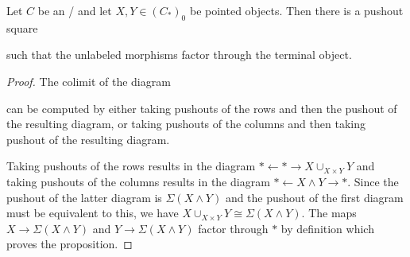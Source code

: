 \begin{lemma}\label{lem:poSqWithFactoringTerminal}
    Let $C$ be an \inftytop/ and let $X,Y\in \left(C_*\right)_0$ be pointed objects. 
    Then there is a pushout square
    \begin{center}
    \end{center}
    such that the unlabeled morphisms factor through the terminal object.
    \begin{proof}
        The colimit of the diagram 
        \begin{center}
        \end{center}
        can be computed by either taking pushouts of the rows and then the pushout of the resulting diagram, or taking pushouts of the columns and then taking pushout of the resulting diagram.
        
        Taking pushouts of the rows results in the diagram $*\xleftarrow{}*\rightarrow X\cup_{X\times Y} Y$ and taking pushouts of the columns results in the diagram $*\xleftarrow{}X\wedge Y\rightarrow *$. 
        Since the pushout of the latter diagram is $\Sigma\left(X\wedge Y\right)$ and the pushout of the first diagram must be equivalent to this, we have $X\cup_{X\times Y} Y\cong\Sigma\left(X\wedge Y\right)$.
        The maps $X\to\Sigma\left(X\wedge Y\right)$ and $Y\to\Sigma\left(X\wedge Y\right)$ factor through $*$ by definition which proves the proposition.
    \end{proof}
\end{lemma}
